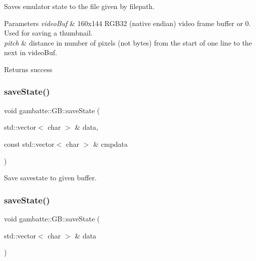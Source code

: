 Saves emulator state to the file given by \textquotesingle{}filepath\textquotesingle{}.


\begin{DoxyParams}{Parameters}
{\em video\+Buf} & 160x144 R\+G\+B32 (native endian) video frame buffer or 0. Used for saving a thumbnail. \\
\hline
{\em pitch} & distance in number of pixels (not bytes) from the start of one line to the next in video\+Buf. \\
\hline
\end{DoxyParams}
\begin{DoxyReturn}{Returns}
success 
\end{DoxyReturn}
\mbox{\label{classgambatte_1_1GB_af6c45af52b0ec127ddcb00a2d32d6b18}} 
\subsubsection{\texorpdfstring{save\+State()}{saveState()}\hspace{0.1cm}{\footnotesize\ttfamily [3/4]}}
{\footnotesize\ttfamily void gambatte\+::\+G\+B\+::save\+State (\begin{DoxyParamCaption}\item[{std\+::vector$<$ char $>$ \&}]{data,  }\item[{const std\+::vector$<$ char $>$ \&}]{cmpdata }\end{DoxyParamCaption})}

Save savestate to given buffer. \mbox{\label{classgambatte_1_1GB_a26dfbfcb3487893188f74bd419c8f23e}} 
\subsubsection{\texorpdfstring{save\+State()}{saveState()}\hspace{0.1cm}{\footnotesize\ttfamily [4/4]}}
{\footnotesize\ttfamily void gambatte\+::\+G\+B\+::save\+State (\begin{DoxyParamCaption}\item[{std\+::vector$<$ char $>$ \&}]{data }\end{DoxyParamCaption})}

